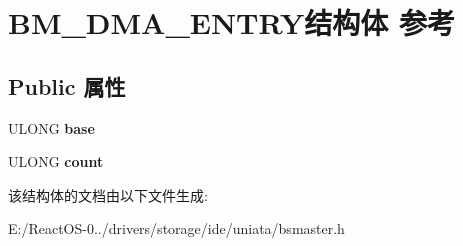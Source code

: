 \hypertarget{struct_b_m___d_m_a___e_n_t_r_y}{}\section{B\+M\+\_\+\+D\+M\+A\+\_\+\+E\+N\+T\+R\+Y结构体 参考}
\label{struct_b_m___d_m_a___e_n_t_r_y}
\subsection*{Public 属性}
\begin{DoxyCompactItemize}
\item 
\mbox{\label{struct_b_m___d_m_a___e_n_t_r_y_a67b7ba530eacb8fe1e5f97c376008a1e}} 
U\+L\+O\+NG {\bfseries base}
\item 
\mbox{\label{struct_b_m___d_m_a___e_n_t_r_y_a273e8622bb27e58d713630581f1d990b}} 
U\+L\+O\+NG {\bfseries count}
\end{DoxyCompactItemize}


该结构体的文档由以下文件生成\+:\begin{DoxyCompactItemize}
\item 
E\+:/\+React\+O\+S-\/0../drivers/storage/ide/uniata/bsmaster.\+h\end{DoxyCompactItemize}
